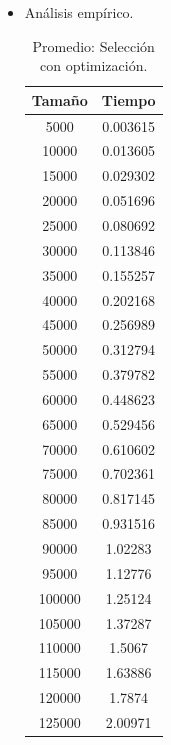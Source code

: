 \documentclass[a4paper,12pt,twoside]{article} %
\begin{document}
\begin{itemize}
	
	\item Análisis empírico.
	
\begin{table}[h]
	\begin{center}
		\begin{tabular}{|c|c|}
		\hline
		Tamaño & Tiempo \\
		\hline
		5000 & 0.003615 \\
		10000 & 0.013605 \\
		15000 & 0.029302 \\
		20000 & 0.051696 \\
		25000 & 0.080692 \\
		30000 & 0.113846 \\
		35000 & 0.155257 \\
		40000 & 0.202168 \\
		45000 & 0.256989 \\
		50000 & 0.312794 \\
		55000 & 0.379782 \\
		60000 & 0.448623 \\
		65000 & 0.529456 \\
		70000 & 0.610602 \\
		75000 & 0.702361 \\
		80000 & 0.817145 \\
		85000 & 0.931516 \\
		90000 & 1.02283 \\
		95000 & 1.12776 \\
		100000 & 1.25124 \\
		105000 & 1.37287 \\
		110000 & 1.5067 \\
		115000 & 1.63886 \\
		120000 & 1.7874 \\
		125000 & 2.00971 \\
		\hline
		\end{tabular}
	\end{center}
	\caption{Promedio: Selección con optimización.}
\end{table}
\newpage

\begin{figure}[h]
  \begin{center}
  

\end{center}
\end{figure}
\end{itemize}
\end{document}
